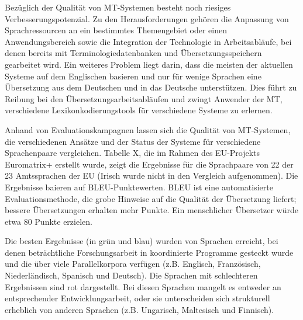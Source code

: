 \documentclass[]{../../metanetpaper}
\begin{document}
\begin{Parallel}[c]{79mm}{78mm}
{Bezüglich der Qualität von MT-Systemen besteht noch riesiges Verbesserungspotenzial. Zu den Herausforderungen gehören die Anpassung von Sprachressourcen an ein bestimmtes Themengebiet oder einen Anwendungsbereich sowie die Integration der Technologie in Arbeitsabläufe, bei denen bereits mit Terminologiedatenbanken und Übersetzungsspeichern gearbeitet wird. Ein weiteres Problem liegt darin, dass die meisten der aktuellen Systeme auf dem Englischen basieren und nur für wenige Sprachen eine Übersetzung aus dem Deutschen und in das Deutsche unterstützen. Dies führt zu Reibung bei den Übersetzungsarbeitsabläufen und zwingt Anwender der MT, verschiedene Lexikonkodierungstools für verschiedene Systeme zu erlernen.

Anhand von Evaluationskampagnen lassen sich die Qualität von MT-Systemen, die verschiedenen Ansätze und der Status der Systeme für verschiedene Sprachenpaare vergleichen. Tabelle X, die im Rahmen des EU-Projekts Euromatrix+ erstellt wurde, zeigt die Ergebnisse für die Sprachpaare von 22 der 23 Amtssprachen der EU (Irisch wurde nicht in den Vergleich aufgenommen). Die Ergebnisse baieren auf BLEU-Punktewerten\cite{bleu1}. BLEU ist eine automatisierte Evaluationsmethode, die grobe Hinweise auf die Qualität der Übersetzung liefert; bessere Übersetzungen erhalten mehr Punkte. Ein menschlicher Übersetzer würde etwa 80 Punkte erzielen.

Die besten Ergebnisse (in grün und blau) wurden von Sprachen erreicht, bei denen beträchtliche Forschungsarbeit in koordinierte Programme gesteckt wurde und die über viele Parallelkorpora verfügen (z.B. Englisch, Französisch, Niederländisch, Spanisch und Deutsch). Die Sprachen mit schlechteren Ergebnissen sind rot dargestellt. Bei diesen Sprachen mangelt es entweder an entsprechender Entwicklungsarbeit, oder sie unterscheiden sich strukturell erheblich von anderen Sprachen (z.B. Ungarisch, Maltesisch und Finnisch).
  }

\end{Parallel}
\end{document}
